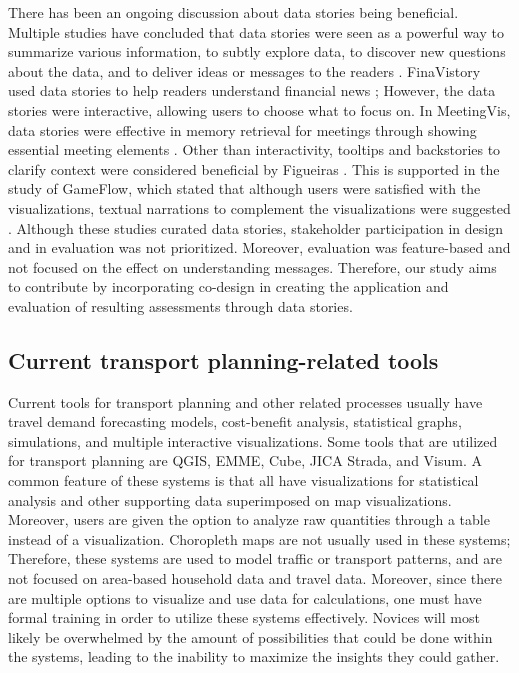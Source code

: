 \documentclass{sigchi}
\begin{document}
There has been an ongoing discussion about data stories being beneficial. Multiple studies have concluded that data stories were seen as a powerful way to summarize various information, to subtly explore data, to discover new questions about the data, and to deliver ideas or messages to the readers \cite{Pavel2013} \cite{Layton2014}. FinaVistory used data stories to help readers understand financial news \cite{Chan2016}; However, the data stories were interactive, allowing users to choose what to focus on. In MeetingVis, data stories were effective in memory retrieval for meetings through showing essential meeting elements \cite{Shi2018}. Other than interactivity, tooltips and backstories to clarify context were considered beneficial by Figueiras \cite{Figueiras2014}. This is supported in the study of GameFlow, which stated that although users were satisfied with the visualizations, textual narrations to complement the visualizations were suggested \cite{Chen2016}. Although these studies curated data stories, stakeholder participation in design and in evaluation was not prioritized. Moreover, evaluation was feature-based and not focused on the effect on understanding messages. Therefore, our study aims to contribute by incorporating co-design in creating the application and evaluation of resulting assessments through data stories. 

\subsection{Current transport planning-related tools}

Current tools for transport planning and other related processes usually have travel demand forecasting models, cost-benefit analysis, statistical graphs, simulations, and multiple interactive visualizations. Some tools that are utilized for transport planning are QGIS, EMME, Cube, JICA Strada, and Visum. A common feature of these systems is that all have visualizations for statistical analysis and other supporting data superimposed on map visualizations. Moreover, users are given the option to analyze raw quantities through a table instead of a visualization. Choropleth maps are not usually used in these systems; Therefore, these systems are used to model traffic or transport patterns, and are not focused on area-based household data and travel data. Moreover, since there are multiple options to visualize and use data for calculations, one must have formal training in order to utilize these systems effectively. Novices will most likely be overwhelmed by the amount of possibilities that could be done within the systems, leading to the inability to maximize the insights they could gather.
\end{document}
